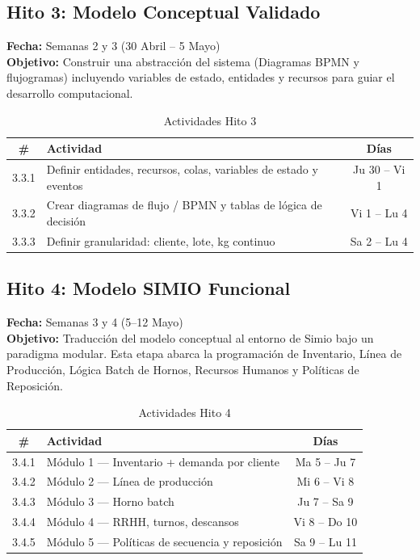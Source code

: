 \documentclass[11pt,letterpaper]{article}
\begin{document}
\subsection{Hito 3: Modelo Conceptual Validado}
\textbf{Fecha:} Semanas 2 y 3 (30 Abril – 5 Mayo)\\
\textbf{Objetivo:} Construir una abstracción del sistema (Diagramas BPMN y flujogramas) incluyendo variables de estado, entidades y recursos para guiar el desarrollo computacional.

\begin{table}[h!]
    \centering
    \small
    \caption{Actividades Hito 3}
    \vspace{0.2cm}
    \begin{tabular}{cp{10cm}c}
        \toprule
        \textbf{\#} & \textbf{Actividad} & \textbf{Días} \\
        \midrule
        3.3.1 & Definir entidades, recursos, colas, variables de estado y eventos & Ju 30 -- Vi 1 \\
        3.3.2 & Crear diagramas de flujo / BPMN y tablas de lógica de decisión & Vi 1 -- Lu 4 \\
        3.3.3 & Definir granularidad: cliente, lote, kg continuo & Sa 2 -- Lu 4\\
        \bottomrule
    \end{tabular}
\end{table}

\subsection{Hito 4: Modelo SIMIO Funcional}
\textbf{Fecha:} Semanas 3 y 4 (5–12 Mayo)\\
\textbf{Objetivo:} Traducción del modelo conceptual al entorno de Simio bajo un paradigma modular. Esta etapa abarca la programación de Inventario, Línea de Producción, Lógica Batch de Hornos, Recursos Humanos y Políticas de Reposición.

\begin{table}[h!]
    \centering
    \small
    \caption{Actividades Hito 4}
    \vspace{0.2cm}
    \begin{tabular}{cp{10cm}c}
        \toprule
        \textbf{\#} & \textbf{Actividad} & \textbf{Días} \\
        \midrule
        3.4.1 & Módulo 1 — Inventario + demanda por cliente & Ma 5 -- Ju 7 \\
        3.4.2 & Módulo 2 — Línea de producción & Mi 6 -- Vi 8 \\
        3.4.3 & Módulo 3 — Horno batch & Ju 7 -- Sa 9 \\
        3.4.4 & Módulo 4 — RRHH, turnos, descansos & Vi 8 -- Do 10 \\
        3.4.5 & Módulo 5 — Políticas de secuencia y reposición & Sa 9 -- Lu 11 \\
        \bottomrule
    \end{tabular}
\end{table}
\end{document}
